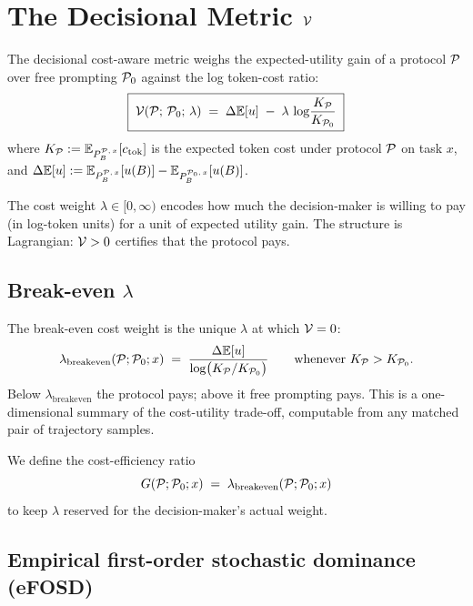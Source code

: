 \section{The Decisional Metric \texorpdfstring{$\mathcal{V}$}{V}}
\label{sec:decisional-metric}

The decisional cost-aware metric weighs the expected-utility gain of a protocol $\mathcal{P}$ over free prompting $\mathcal{P}_0$ against the log token-cost ratio:
\begin{equation}
  \boxed{\;
  \mathcal{V}(\mathcal{P};\, \mathcal{P}_0;\, \lambda)
  \;=\;
  \Delta \mathbb{E}[u]
  \;-\;
  \lambda\, \log\!\frac{K_{\mathcal{P}}}{K_{\mathcal{P}_0}}
  \;}
  \label{eq:decisional-metric}
\end{equation}
where $K_{\mathcal{P}} := \mathbb{E}_{P_B^{\mathcal{P},\,x}}[c_{\mathrm{tok}}]$ is the expected token cost under protocol $\mathcal{P}$ on task $x$, and $\Delta\mathbb{E}[u] := \mathbb{E}_{P_B^{\mathcal{P},\,x}}[u(B)] - \mathbb{E}_{P_B^{\mathcal{P}_0,\,x}}[u(B)]$.

The cost weight $\lambda \in [0, \infty)$ encodes how much the decision-maker is willing to pay (in log-token units) for a unit of expected utility gain. The structure is Lagrangian: $\mathcal{V} > 0$ certifies that the protocol pays.

\subsection{Break-even \texorpdfstring{$\lambda$}{lambda}}

The break-even cost weight is the unique $\lambda$ at which $\mathcal{V} = 0$:
\begin{equation}
  \lambda_{\mathrm{breakeven}}(\mathcal{P}; \mathcal{P}_0; x) \;=\; \frac{\Delta \mathbb{E}[u]}{\log\!\big(K_{\mathcal{P}} / K_{\mathcal{P}_0}\big)}
  \qquad \text{whenever } K_{\mathcal{P}} > K_{\mathcal{P}_0}.
  \label{eq:lambda-breakeven}
\end{equation}
Below $\lambda_{\mathrm{breakeven}}$ the protocol pays; above it free prompting pays. This is a one-dimensional summary of the cost-utility trade-off, computable from any matched pair of trajectory samples.

We define the cost-efficiency ratio
\begin{equation}
  G(\mathcal{P}; \mathcal{P}_0; x) \;=\; \lambda_{\mathrm{breakeven}}(\mathcal{P}; \mathcal{P}_0; x)
  \label{eq:cost-efficiency}
\end{equation}
to keep $\lambda$ reserved for the decision-maker's actual weight.

\subsection{Empirical first-order stochastic dominance (eFOSD)}

